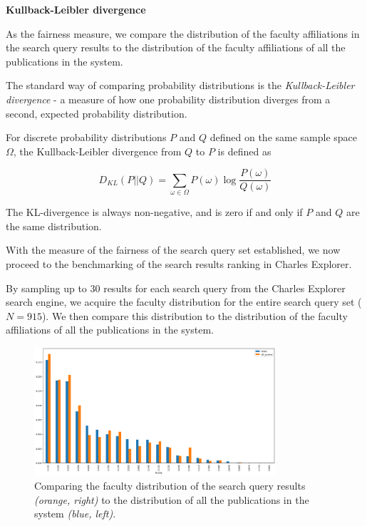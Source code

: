 \textbf{Kullback-Leibler divergence}

As the fairness measure, we compare the distribution of the faculty affiliations in the search query results 
to the distribution of the faculty affiliations of all the publications in the system.

The standard way of comparing probability distributions is the \textit{Kullback-Leibler divergence} - a measure of how one probability distribution diverges from a second, expected probability distribution.

For discrete probability distributions $P$ and $Q$ defined on the same sample space $\Omega$, the Kullback-Leibler divergence from $Q$ to $P$ is defined as

$$
D_{KL}(P||Q) = \sum_{\omega \in \Omega} P(\omega) \log \frac{P(\omega)}{Q(\omega)}
$$

The KL-divergence is always non-negative, and is zero if and only if $P$ and $Q$ are the same distribution.

With the measure of the fairness of the search query set established, we now proceed to the benchmarking of the search results ranking in Charles Explorer.

By sampling up to 30 results for each search query from the Charles Explorer search engine, we acquire the faculty distribution for the entire search query set ($N = 915$).
We then compare this distribution to the distribution of the faculty affiliations of all the publications in the system.

\begin{figure}[ht!]
    \captionsetup{width=.9\linewidth}
    \includegraphics[width=0.8\textwidth]{../img/all-queries-vs-totals.png}
    \centering
    \caption{Comparing the faculty distribution of the search query results \textit{(orange, right)} to the distribution of all the publications in the system \textit{(blue, left)}.}
\end{figure}

